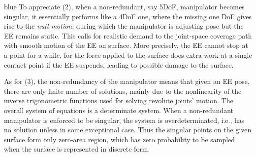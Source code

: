 \documentclass[Afour,sageh,times]{sagej}
\begin{document}
\begin{color}{blue}
To appreciate (2), when a non-redundant, say 5DoF, manipulator becomes singular, it essentially performs like a 4DoF one, where the missing one DoF gives rise to the \textit{null motion}, during which the manipulator is adjusting pose but the EE remains static. 
This calls for realistic demand to the joint-space coverage path with smooth motion of the EE on surface. More precisely, the EE cannot stop at a point for a while, for the force applied to the surface does extra work at a single contact point if the EE suspends, leading to possible damage to the surface. 

As for (3), the non-redundancy of the manipulator means that given an EE pose, there are only finite number of solutions, mainly due to the nonlinearity of the inverse trigonometric functions used for solving revolute joints' motion. The overall system of equations is a determinate system. When a non-redundant manipulator is enforced to be singular, the system is overdeterminated, i.e., has no solution unless in some exceptional case. Thus the singular points on the given surface form only zero-area region, which has zero probability to be sampled when the surface is represented in discrete form. 


\end{color}



\end{document}
